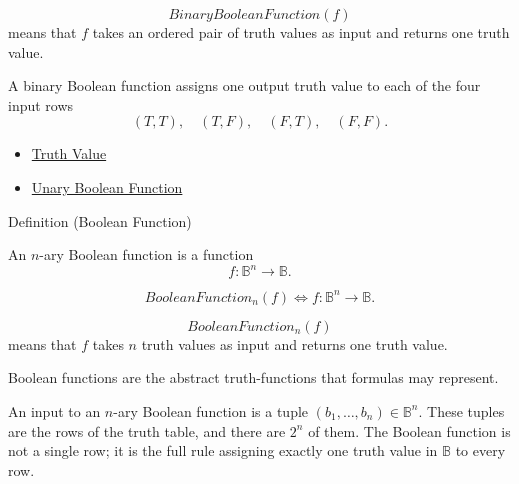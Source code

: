 \begin{remark*}
\[
BinaryBooleanFunction(f)
\]
means that \(f\) takes an ordered pair of truth values as input and returns one truth value.
\end{remark*}

\begin{remark*}[Interpretation]
A binary Boolean function assigns one output truth value to each of the four input rows
\[
(T,T),\quad (T,F),\quad (F,T),\quad (F,F).
\]
\end{remark*}

\begin{dependencies}
\begin{itemize}
  \item \hyperref[def:truth-value-propositional-logic]{Truth Value}
  \item \hyperref[def:unary-boolean-function-propositional-logic]{Unary Boolean Function}
\end{itemize}
\end{dependencies}
\begin{definitionbox}{Definition (Boolean Function)}
\begin{definition}
\label{def:boolean-function-propositional-logic}
An \(n\)-ary Boolean function is a function
\[
f:\mathbb{B}^n\to\mathbb{B}.
\]
\end{definition}
\end{definitionbox}

\begin{remark*}
\[
BooleanFunction_n(f)
\Longleftrightarrow
f:\mathbb{B}^n\to\mathbb{B}.
\]
\end{remark*}

\begin{remark*}
\[
BooleanFunction_n(f)
\]
means that \(f\) takes \(n\) truth values as input and returns one truth value.
\end{remark*}

\begin{remark*}[Interpretation]
Boolean functions are the abstract truth-functions that formulas may represent.
\end{remark*}

\begin{remark*}[Exposition]
An input to an \(n\)-ary Boolean function is a tuple
\((b_1,\ldots,b_n)\in\mathbb{B}^n\). These tuples are the rows of the truth table, and there are \(2^n\) of them. The Boolean function is not a single row; it is the full rule assigning exactly one truth value in \(\mathbb{B}\) to every row.
\end{remark*}

